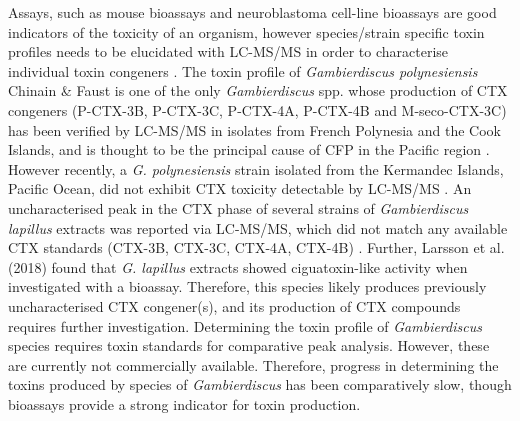 \documentclass[12pt]{article}
\begin{document}
Assays, such as mouse bioassays and neuroblastoma cell-line bioassays are good indicators of the toxicity of an organism, however species/strain specific toxin profiles needs to be elucidated with LC-MS/MS in order to characterise individual toxin congeners \citep{diogened2014chemistry}. 
The toxin profile of \textit{Gambierdiscus polynesiensis} Chinain \& Faust is one of the only \emph{Gambierdiscus} spp.
whose production of CTX congeners (P-CTX-3B, P-CTX-3C, P-CTX-4A, P-CTX-4B and M-seco-CTX-3C) has been verified by LC-MS/MS in isolates from French Polynesia and the Cook Islands, and is thought to be the principal cause of CFP in the Pacific region \citep{chinain2010growth,rhodes2014production}. 
However recently, a \emph{G. polynesiensis} strain isolated from the Kermandec Islands, Pacific Ocean, did not exhibit CTX toxicity detectable by LC-MS/MS  \citep{rhodes2017epiphytic}.
An uncharacterised peak in the CTX phase of several strains of \emph{Gambierdiscus lapillus} extracts was reported via LC-MS/MS, which did not match any available CTX standards (CTX-3B, CTX-3C, CTX-4A, CTX-4B) \citep{kretzschmar2017characterization}. 
Further, Larsson et al. (2018) found that \emph{G. lapillus} extracts showed ciguatoxin-like activity when investigated with a bioassay. 
Therefore, this species likely produces previously uncharacterised CTX congener(s), and its production of CTX compounds requires further investigation.
Determining the toxin profile of \textit{Gambierdiscus} species requires toxin standards for comparative peak analysis. 
However, these are currently not commercially available. 
Therefore, progress in determining the toxins produced by species of \emph{Gambierdiscus} has been comparatively slow, though bioassays provide a strong indicator for toxin production.\\

\end{document}
